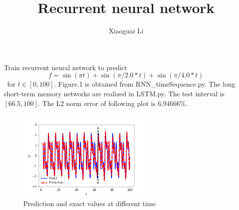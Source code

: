 \documentclass{article}
\title{Recurrent neural network}
\author{Xiaoguai Li}
\date{}
\begin{document}
\maketitle
Train recurrent neural network to predict
\begin{equation}\nonumber
f=\sin(\pi t)+\sin(\pi/2.0*t)+\sin(\pi/4.0*t)
\end{equation}\
for $t \in [0, 100]$.
Figure.1 is obtained from RNN\_timeSequence.py. The long short-term memory networks are realized in LSTM.py. The test interval is $[66.5,100]$. The L2 norm error of following plot is 6.94666\%.
\begin{figure}[h]
    \center
    \includegraphics[width=0.6\textwidth]{prediction}
    \caption{Prediction and exact values at different time}
\end{figure}
\end{document}
